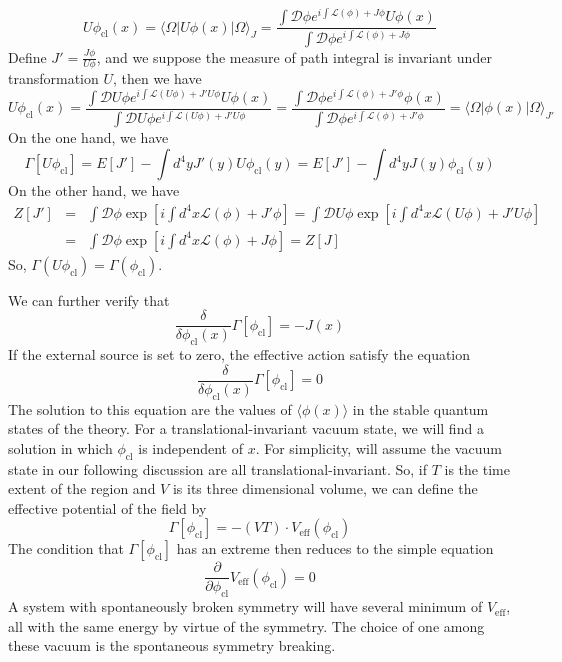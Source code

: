 \documentclass[cyan]{elegantnote}
\begin{document}
\begin{newproof}
\[ U\phi_{\mathrm{cl}}(x) = \langle \Omega | U\phi(x) | \Omega\rangle_{J} = \frac{\int \mathcal{D}\phi e^{i \int \mathcal{L}(\phi)+J\phi}U\phi(x)}{\int \mathcal{D}\phi e^{i \int \mathcal{L}(\phi)+J\phi}}\]
Define $J' = \frac{J\phi}{U\phi}$,  and we suppose the measure of path integral is invariant under transformation $U$, then we have
\[ U\phi_{\mathrm{cl}}(x) = \frac{\int \mathcal{D}U\phi e^{i \int \mathcal{L}(U\phi)+J'U\phi}U\phi(x)}{\int \mathcal{D}U\phi e^{i \int \mathcal{L}(U\phi)+J'U\phi}} =  \frac{\int \mathcal{D}\phi e^{i \int \mathcal{L}(\phi)+J'\phi}\phi(x)}{\int \mathcal{D}\phi e^{i \int \mathcal{L}(\phi)+J'\phi}} = \langle \Omega | \phi(x) | \Omega\rangle_{J'}\]
On the one hand, we have
\[\Gamma[U\phi_{\mathrm{cl}}] = E[J'] - \int d^4y J'(y)U\phi_{\mathrm{cl}}(y) =  E[J'] - \int d^4y J(y)\phi_{\mathrm{cl}}(y)\]
On the other hand, we have
\begin{eqnarray}
Z[J'] &=& \int \mathcal{D}\phi \exp \left[ i \int d^4x \mathcal{L}(\phi)+J'\phi \right] =  \int \mathcal{D}U\phi \exp \left[ i \int d^4x \mathcal{L}(U\phi)+J'U\phi \right] \nonumber
\\
&=& \int \mathcal{D}\phi \exp \left[ i \int d^4x \mathcal{L}(\phi)+J\phi \right] = Z[J] \nonumber
\end{eqnarray}
So, $\Gamma(U\phi_{\mathrm{cl}}) = \Gamma(\phi_{\mathrm{cl}})$.
\end{newproof}

\noindent
We can further verify that
\[\frac{\delta}{\delta \phi_{\mathrm{cl}}(x)} \Gamma[\phi_{\mathrm{cl}}] = -J(x)\]
If the external source is set to zero, the effective action satisfy the equation
\[\frac{\delta}{\delta \phi_{\mathrm{cl}}(x)} \Gamma[\phi_{\mathrm{cl}}] = 0\]
The solution to this equation are the values of $\langle \phi(x) \rangle$ in the stable quantum states of the theory. For a translational-invariant vacuum state, we will find a solution in which $\phi_{\mathrm{cl}}$ is independent of $x$. For simplicity, will assume the vacuum state in our following discussion are all translational-invariant. 
So, if $T$ is the time extent of the region and $V$ is its three dimensional volume, we can define the effective potential of the field by
\[\Gamma[\phi_{\mathrm{cl}}] = -(VT) \cdot V_{\mathrm{eff}}(\phi_{\mathrm{cl}})\]
The condition that $\Gamma[\phi_{\mathrm{cl}}]$ has an extreme then reduces to the simple equation
\[\frac{\partial}{\partial \phi_{\mathrm{cl}}} V_{\mathrm{eff}}(\phi_{\mathrm{cl}}) = 0\] 
A system with spontaneously broken symmetry will have several minimum of $V_{\mathrm{eff}}$, all with the same energy by virtue of the symmetry. The choice of one among these vacuum is the spontaneous symmetry breaking.
\end{document}
